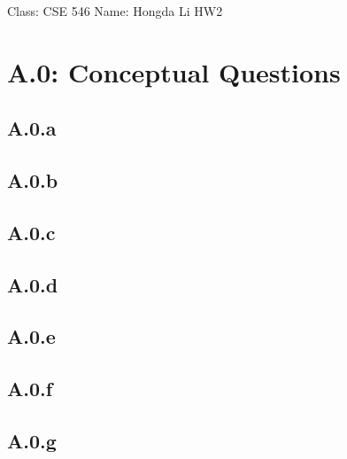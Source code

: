 \documentclass[]{article}
\begin{document}
\begin{center}
    Class: CSE 546 \quad Name: Hongda Li \quad HW2
\end{center}

\section*{A.0: Conceptual Questions}
    \subsection*{A.0.a}    
    \subsection*{A.0.b}
    \subsection*{A.0.c}
    \subsection*{A.0.d}
    \subsection*{A.0.e}
    \subsection*{A.0.f}
    \subsection*{A.0.g}
\end{document}
